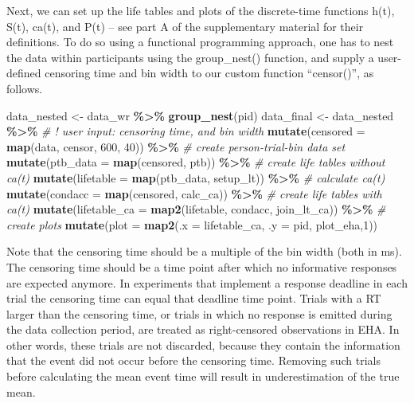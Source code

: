 \documentclass[
  man, donotrepeattitle,floatsintext]{apa6}
\newenvironment{Shaded}{\begin{snugshade}}{\end{snugshade}}
\newcommand{\AttributeTok}[1]{\textcolor[rgb]{0.13,0.29,0.53}{#1}}
\newcommand{\CommentTok}[1]{\textcolor[rgb]{0.56,0.35,0.01}{\textit{#1}}}
\newcommand{\DecValTok}[1]{\textcolor[rgb]{0.00,0.00,0.81}{#1}}
\newcommand{\FunctionTok}[1]{\textcolor[rgb]{0.13,0.29,0.53}{\textbf{#1}}}
\newcommand{\NormalTok}[1]{#1}
\newcommand{\OtherTok}[1]{\textcolor[rgb]{0.56,0.35,0.01}{#1}}
\newcommand{\SpecialCharTok}[1]{\textcolor[rgb]{0.81,0.36,0.00}{\textbf{#1}}}
\begin{document}
\normalsize

Next, we can set up the life tables and plots of the discrete-time functions h(t), S(t), ca(t), and P(t) -- see part A of the supplementary material for their definitions. To do so using a functional programming approach, one has to nest the data within participants using the group\_nest() function, and supply a user-defined censoring time and bin width to our custom function ``censor()'', as follows.

\footnotesize

\begin{Shaded}
\begin{Highlighting}[]
\NormalTok{data\_nested }\OtherTok{\textless{}{-}}\NormalTok{ data\_wr }\SpecialCharTok{\%\textgreater{}\%} \FunctionTok{group\_nest}\NormalTok{(pid)}
\NormalTok{data\_final }\OtherTok{\textless{}{-}}\NormalTok{ data\_nested }\SpecialCharTok{\%\textgreater{}\%} 
  \CommentTok{\# ! user input: censoring time, and bin width}
  \FunctionTok{mutate}\NormalTok{(}\AttributeTok{censored =} \FunctionTok{map}\NormalTok{(data, censor, }\DecValTok{600}\NormalTok{, }\DecValTok{40}\NormalTok{)) }\SpecialCharTok{\%\textgreater{}\%}   
  \CommentTok{\# create person{-}trial{-}bin data set}
  \FunctionTok{mutate}\NormalTok{(}\AttributeTok{ptb\_data =} \FunctionTok{map}\NormalTok{(censored, ptb)) }\SpecialCharTok{\%\textgreater{}\%}          
  \CommentTok{\# create life tables without ca(t)}
  \FunctionTok{mutate}\NormalTok{(}\AttributeTok{lifetable =} \FunctionTok{map}\NormalTok{(ptb\_data, setup\_lt)) }\SpecialCharTok{\%\textgreater{}\%}   
  \CommentTok{\# calculate ca(t)}
  \FunctionTok{mutate}\NormalTok{(}\AttributeTok{condacc =} \FunctionTok{map}\NormalTok{(censored, calc\_ca)) }\SpecialCharTok{\%\textgreater{}\%}      
  \CommentTok{\# create life tables with ca(t)}
  \FunctionTok{mutate}\NormalTok{(}\AttributeTok{lifetable\_ca =} \FunctionTok{map2}\NormalTok{(lifetable, condacc, join\_lt\_ca)) }\SpecialCharTok{\%\textgreater{}\%}    
  \CommentTok{\# create plots }
  \FunctionTok{mutate}\NormalTok{(}\AttributeTok{plot =} \FunctionTok{map2}\NormalTok{(}\AttributeTok{.x =}\NormalTok{ lifetable\_ca, }\AttributeTok{.y =}\NormalTok{ pid, plot\_eha,}\DecValTok{1}\NormalTok{))  }
\end{Highlighting}
\end{Shaded}

\normalsize

Note that the censoring time should be a multiple of the bin width (both in ms). The censoring time should be a time point after which no informative responses are expected anymore. In experiments that implement a response deadline in each trial the censoring time can equal that deadline time point. Trials with a RT larger than the censoring time, or trials in which no response is emitted during the data collection period, are treated as right-censored observations in EHA. In other words, these trials are not discarded, because they contain the information that the event did not occur before the censoring time. Removing such trials before calculating the mean event time will result in underestimation of the true mean.
\end{document}
